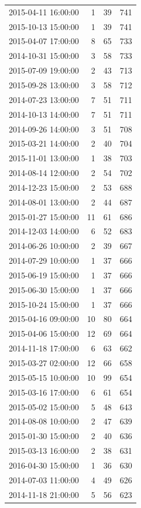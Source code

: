 \begin{tabular}{lrrr}
2015-04-11 16:00:00 & 1 & 39 & 741 \\
2015-10-13 15:00:00 & 1 & 39 & 741 \\
2015-04-07 17:00:00 & 8 & 65 & 733 \\
2014-10-31 15:00:00 & 3 & 58 & 733 \\
2015-07-09 19:00:00 & 2 & 43 & 713 \\
2015-09-28 13:00:00 & 3 & 58 & 712 \\
2014-07-23 13:00:00 & 7 & 51 & 711 \\
2014-10-13 14:00:00 & 7 & 51 & 711 \\
2014-09-26 14:00:00 & 3 & 51 & 708 \\
2015-03-21 14:00:00 & 2 & 40 & 704 \\
2015-11-01 13:00:00 & 1 & 38 & 703 \\
2014-08-14 12:00:00 & 2 & 54 & 702 \\
2014-12-23 15:00:00 & 2 & 53 & 688 \\
2014-08-01 13:00:00 & 2 & 44 & 687 \\
2015-01-27 15:00:00 & 11 & 61 & 686 \\
2014-12-03 14:00:00 & 6 & 52 & 683 \\
2014-06-26 10:00:00 & 2 & 39 & 667 \\
2014-07-29 10:00:00 & 1 & 37 & 666 \\
2015-06-19 15:00:00 & 1 & 37 & 666 \\
2015-06-30 15:00:00 & 1 & 37 & 666 \\
2015-10-24 15:00:00 & 1 & 37 & 666 \\
2015-04-16 09:00:00 & 10 & 80 & 664 \\
2015-04-06 15:00:00 & 12 & 69 & 664 \\
2014-11-18 17:00:00 & 6 & 63 & 662 \\
2015-03-27 02:00:00 & 12 & 66 & 658 \\
2015-05-15 10:00:00 & 10 & 99 & 654 \\
2015-03-16 17:00:00 & 6 & 61 & 654 \\
2015-05-02 15:00:00 & 5 & 48 & 643 \\
2014-08-08 10:00:00 & 2 & 47 & 639 \\
2015-01-30 15:00:00 & 2 & 40 & 636 \\
2015-03-13 16:00:00 & 2 & 38 & 631 \\
2016-04-30 15:00:00 & 1 & 36 & 630 \\
2014-07-03 11:00:00 & 4 & 49 & 626 \\
2014-11-18 21:00:00 & 5 & 56 & 623 \\

\end{tabular}
